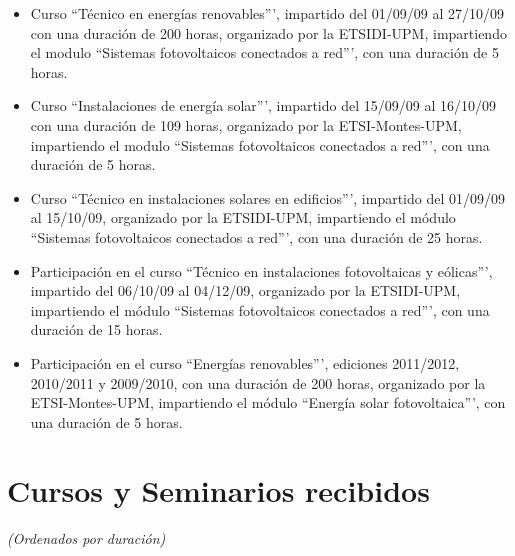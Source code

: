 \documentclass[article, a4paper]{memoir}
\begin{document}
\begin{itemize}
\item Curso ``Técnico en energías renovables''', impartido del 01/09/09 al 27/10/09 con una duración de 200 horas, organizado por la ETSIDI-UPM, impartiendo el modulo ``Sistemas fotovoltaicos conectados a red''', con una duración de 5 horas.

\item Curso ``Instalaciones de energía solar''', impartido del 15/09/09 al 16/10/09 con una duración de 109 horas, organizado por la ETSI-Montes-UPM, impartiendo el modulo ``Sistemas fotovoltaicos conectados a red''', con una duración de 5 horas.

\item Curso ``Técnico en instalaciones solares en edificios''', impartido del 01/09/09 al 15/10/09, organizado por la ETSIDI-UPM, impartiendo el módulo ``Sistemas fotovoltaicos conectados a red''', con una duración de 25 horas.

\item Participación en el curso ``Técnico en instalaciones fotovoltaicas y eólicas''', impartido del 06/10/09 al 04/12/09, organizado por la ETSIDI-UPM, impartiendo el módulo ``Sistemas fotovoltaicos conectados a red''', con una duración de 15 horas.

\item Participación en el curso ``Energías renovables''', ediciones 2011/2012, 2010/2011 y 2009/2010, con una duración de 200 horas, organizado por la ETSI-Montes-UPM, impartiendo el módulo ``Energía solar fotovoltaica''', con una duración de 5 horas.
\end{itemize}

\section{Cursos y Seminarios recibidos}
\label{sec-12}

\emph{(Ordenados por duración)}
\end{document}
